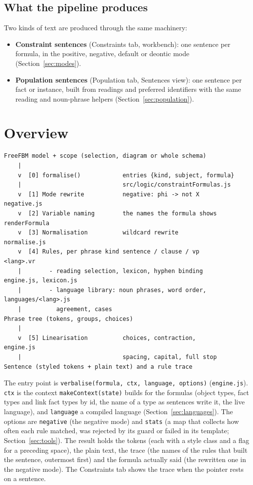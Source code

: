 \documentclass[11pt, a4paper]{article}
\newcommand{\code}[1]{\texttt{\color{codefg}#1}}
\begin{document}
\subsection{What the pipeline produces}

Two kinds of text are produced through the same machinery:

\begin{itemize}
  \item \textbf{Constraint sentences} (Constraints tab, workbench): one
        sentence per formula, in the positive, negative, default or deontic
        mode (Section~\ref{sec:modes}).
  \item \textbf{Population sentences} (Population tab, Sentences view): one
        sentence per fact or instance, built from readings and preferred
        identifiers with the same reading and noun-phrase helpers
        (Section~\ref{sec:population}).
\end{itemize}

\section{Overview}
\label{sec:architecture}

\begin{lstlisting}
FreeFBM model + scope (selection, diagram or whole schema)
    |
    v  [0] formalise()            entries {kind, subject, formula}
    |                             src/logic/constraintFormulas.js
    v  [1] Mode rewrite           negative: phi -> not X       negative.js
    v  [2] Variable naming        the names the formula shows  renderFormula
    v  [3] Normalisation          wildcard rewrite             normalise.js
    v  [4] Rules, per phrase kind sentence / clause / vp       <lang>.vr
    |        - reading selection, lexicon, hyphen binding      engine.js, lexicon.js
    |        - language library: noun phrases, word order,     languages/<lang>.js
    |          agreement, cases
Phrase tree (tokens, groups, choices)
    |
    v  [5] Linearisation          choices, contraction,        engine.js
    |                             spacing, capital, full stop
Sentence (styled tokens + plain text) and a rule trace
\end{lstlisting}

The entry point is \code{verbalise(formula, ctx, language, options)}
(\code{engine.js}). \code{ctx} is the context \code{makeContext(state)}
builds for the formulas (object types, fact types and link fact types by id,
the name of a type as sentences write it, the live language), and
\code{language} a compiled language (Section~\ref{sec:languages}). The
options are \code{negative} (the negative mode) and \code{stats} (a map that
collects how often each rule matched, was rejected by its guard or failed in
its template; Section~\ref{sec:tools}). The result holds the tokens (each
with a style class and a flag for a preceding space), the plain text, the
trace (the names of the rules that built the sentence, outermost first) and
the formula actually said (the rewritten one in the negative mode). The
Constraints tab shows the trace when the pointer rests on a sentence.
\end{document}
